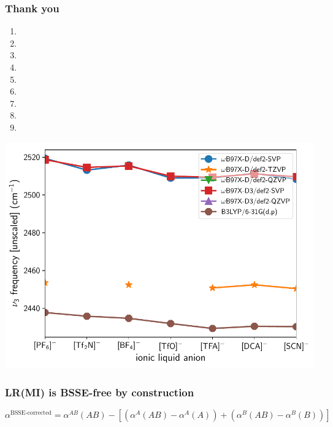 \documentclass[%
    xcolor=usenames,dvipsnames,svgnames%
]{beamer}
\newenvironment{nscenter}
 {\parskip=0pt\par\nopagebreak\centering}
 {\par\noindent\ignorespacesafterend}
\begin{document}
\begin{frame}
  \frametitle{Thank you}
  \scriptsize
  \begin{enumerate}
  \item {}
  \item {}
  \item {}
  \item {}
  \item {}
  \item {}
  \item {}
  \item {}
  \item {}
  \end{enumerate}
\end{frame}

\appendix

\begin{frame}
  \begin{nscenter}
    \includegraphics[width=\linewidth,keepaspectratio]{./figures/updated_methods.pdf}
  \end{nscenter}
\end{frame}

\begin{frame}
  \frametitle{LR(MI) is BSSE-free by construction}
  \scriptsize
  \begin{equation*}
    \alpha^{\text{BSSE-corrected}} = \alpha^{AB}(AB) - \left[ \left( \alpha^{A}(AB) - \alpha^{A}(A) \right) + \left( \alpha^{B}(AB) - \alpha^{B}(B) \right) \right]
    \label{eq:bsse-corrected-polarizability}
  \end{equation*}
\end{frame}
\end{document}
